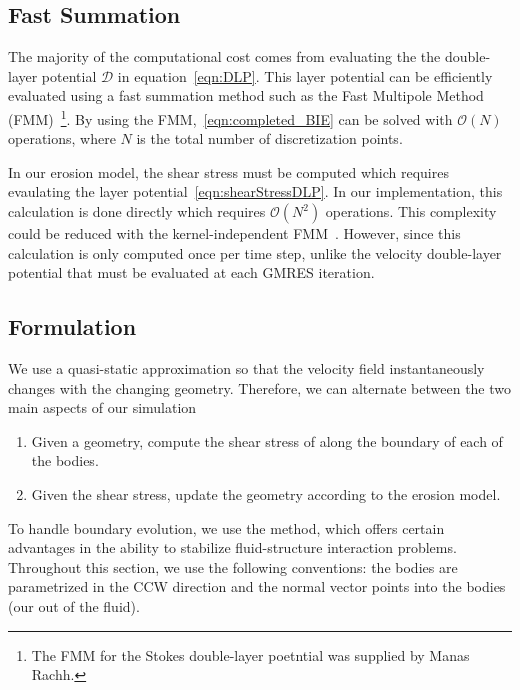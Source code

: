 \documentclass[preprint, 10pt]{elsarticle}
\begin{document}
\subsection{Fast Summation} 
The majority of the computational cost comes from evaluating the the
double-layer potential $\mathcal{D}$ in equation~\eqref{eqn:DLP}.  This
layer potential can be efficiently evaluated using a fast summation
method such as the Fast Multipole Method
(FMM)~\cite{gre-rok1987}\footnote{The FMM for the Stokes double-layer
poetntial was supplied by Manas Rachh.}.  By using the
FMM,~\eqref{eqn:completed_BIE} can be solved with $\mathcal{O}(N)$
operations, where $N$ is the total number of discretization points.

In our erosion model, the shear stress must be computed which requires
evaulating the layer potential~\eqref{eqn:shearStressDLP}.  In our
implementation, this calculation is done directly which requires
$\mathcal{O}(N^2)$ operations.  This complexity could be reduced with
the kernel-independent FMM~\cite{yin-bir-zor2004}.  However, since this
calculation is only computed once per time step, unlike the velocity
double-layer potential that must be evaluated at each GMRES iteration.  

\subsection{\thL Formulation} 
\label{sec:thetaL}

We use a quasi-static approximation so that the velocity field
instantaneously changes with the changing geometry.  Therefore, we can
alternate between the two main aspects of our simulation
\begin{enumerate}
  \item Given a geometry, compute the shear stress of along the boundary
    of each of the bodies.
  \item Given the shear stress, update the geometry according to the
    erosion model.
\end{enumerate}

To handle boundary evolution, we use the \thL    method, which offers certain advantages in the ability to stabilize fluid-structure interaction problems. Throughout this section, we use the following conventions: the bodies are parametrized in the CCW direction and the normal vector points into the bodies (our out of the fluid).
\end{document}
